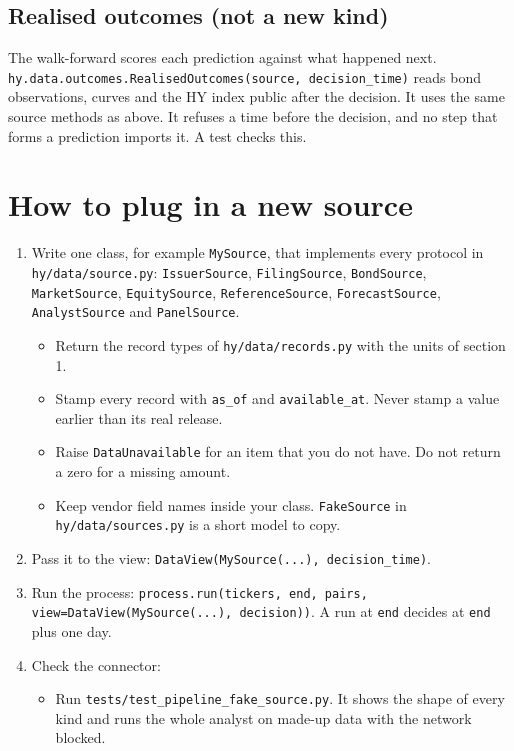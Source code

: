 \documentclass[11pt,a4paper]{article}
\newcommand{\code}[1]{\texttt{\small #1}}
\begin{document}
\subsection{Realised outcomes (not a new kind)}
\noindent The walk-forward scores each prediction against what happened next.
\code{hy.data.outcomes.RealisedOutcomes(source, decision\_time)} reads bond observations, curves and the HY index public
after the decision. It uses the same source methods as above. It refuses a time before the decision, and no step that
forms a prediction imports it. A test checks this.

\section{How to plug in a new source}
\begin{enumerate}
\item Write one class, for example \code{MySource}, that implements every protocol in \code{hy/data/source.py}:
  \code{IssuerSource}, \code{FilingSource}, \code{BondSource}, \code{MarketSource}, \code{EquitySource},
  \code{ReferenceSource}, \code{ForecastSource}, \code{AnalystSource} and \code{PanelSource}.
  \begin{itemize}
  \item Return the record types of \code{hy/data/records.py} with the units of section 1.
  \item Stamp every record with \code{as\_of} and \code{available\_at}. Never stamp a value earlier than its real
    release.
  \item Raise \code{DataUnavailable} for an item that you do not have. Do not return a zero for a missing amount.
  \item Keep vendor field names inside your class. \code{FakeSource} in \code{hy/data/sources.py} is a short model to
    copy.
  \end{itemize}
\item Pass it to the view: \code{DataView(MySource(...), decision\_time)}.
\item Run the process: \code{process.run(tickers, end, pairs, view=DataView(MySource(...), decision))}. A run at
  \code{end} decides at \code{end} plus one day.
\item Check the connector:
  \begin{itemize}
  \item Run \code{tests/test\_pipeline\_fake\_source.py}. It shows the shape of every kind and runs the whole analyst
    on made-up data with the network blocked.

\end{itemize}
\end{enumerate}
\end{document}
